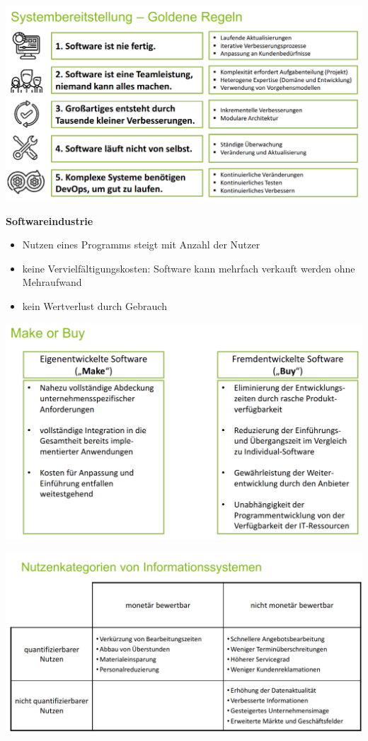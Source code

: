 \documentclass[a4]{scrartcl}
\begin{document}
\includegraphics[scale=0.3]{GoldeneRegeln.png}

\newpage
\textbf{Softwareindustrie}

\begin{itemize}
\item Nutzen eines Programms steigt mit Anzahl der Nutzer
\item keine Vervielfältigungskosten: Software kann mehrfach verkauft werden ohne Mehraufwand
\item kein Wertverlust durch Gebrauch
\end{itemize}

\includegraphics[scale=0.3]{MakeOrBuy.png}

\includegraphics[scale=0.3]{Nutzen.png}
\end{document}
